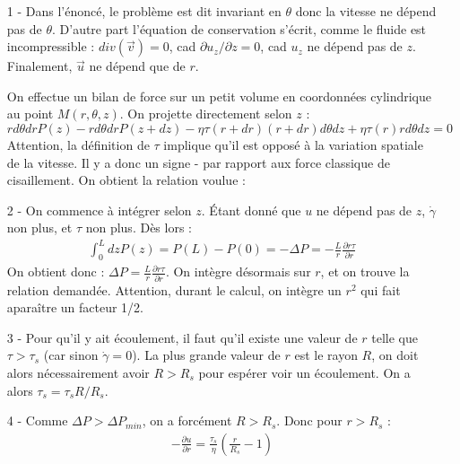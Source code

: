 \documentclass{report}
\begin{document}
\begin{itemize}
	\item[1 - ] Dans l'énoncé, le problème est dit invariant en $\theta$ donc la vitesse ne dépend pas de $\theta$. D'autre part l'équation de conservation s'écrit, comme le fluide est incompressible : $div(\vec{v})=0$, cad $\partial u_z/\partial z=0$, cad $u_z$ ne dépend pas de $z$. Finalement, $\vec{u}$ ne dépend que de $r$.
	
	On effectue un bilan de force sur un petit volume en coordonnées cylindrique au point $M(r,\theta,z)$. On projette directement selon $z$ :
	\begin{equation}
		rd\theta drP(z) - rd\theta drP(z+dz) - \eta\tau(r+dr)(r+dr)d\theta dz+ \eta\tau(r)rd\theta dz =0
	\end{equation}
Attention, la définition de $\tau$ implique qu'il est opposé à la variation spatiale de la vitesse. Il y a donc un signe - par rapport aux force classique de cisaillement. 
On obtient la relation voulue :

\noindent{}

	\item[2 -] On commence à intégrer selon $z$. Étant donné que $u$ ne dépend pas de $z$, $\dot{\gamma}$ non plus, et $\tau$ non plus. Dès lors :
	\begin{align*}
		\int_0^Ldz P(z) = P(L)-P(0)=-\Delta P =-\frac{L}{r}\frac{\partial r\tau}{\partial r}
	\end{align*}
	On obtient donc : $\Delta P =\frac{L}{r}\frac{\partial r\tau}{\partial r}$. On intègre désormais sur $r$, et on trouve la relation demandée. Attention, durant le calcul, on intègre un $r^2$ qui fait aparaître un facteur 1/2. 
	
	\item[3 - ] Pour qu'il y ait écoulement, il faut qu'il existe une valeur de $r$ telle que $\tau>\tau_s$ (car sinon $\dot{\gamma}=0$). La plus grande valeur de $r$ est le rayon $R$, on doit alors nécessairement avoir $R>R_s$ pour espérer voir un écoulement. On a alors $\tau_s = \tau_s R/R_s$.

\noindent{}
	
	\item[4 - ] Comme $\Delta P > \Delta P_{min}$, on a forcément $R>R_s$. Donc pour $r>R_s$ :
	\begin{align*}
		-\frac{\partial u}{\partial r}=\frac{\tau_s}{\eta}\left( \frac{r}{R_s} - 1\right) 
	\end{align*}
	

\end{itemize}
\end{document}
